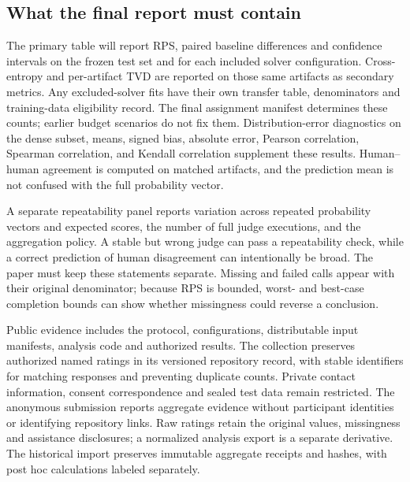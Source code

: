 \subsection{What the final report must contain}
The primary table will report RPS, paired baseline differences and confidence intervals on the frozen test set and for each included solver configuration.
Cross-entropy and per-artifact TVD are reported on those same artifacts as secondary metrics.
Any excluded-solver fits have their own transfer table, denominators and training-data eligibility record.
The final assignment manifest determines these counts; earlier budget scenarios do not fix them.
Distribution-error diagnostics on the dense subset, means, signed bias, absolute error, Pearson correlation, Spearman correlation, and Kendall correlation supplement these results.
Human--human agreement is computed on matched artifacts, and the prediction mean is not confused with the full probability vector.

A separate repeatability panel reports variation across repeated probability vectors and expected scores, the number of full judge executions, and the aggregation policy.
A stable but wrong judge can pass a repeatability check, while a correct prediction of human disagreement can intentionally be broad.
The paper must keep these statements separate.
Missing and failed calls appear with their original denominator; because RPS is bounded, worst- and best-case completion bounds can show whether missingness could reverse a conclusion.

Public evidence includes the protocol, configurations, distributable input manifests, analysis code and authorized results.
The collection preserves authorized named ratings in its versioned repository record, with stable identifiers for matching responses and preventing duplicate counts.
Private contact information, consent correspondence and sealed test data remain restricted.
The anonymous submission reports aggregate evidence without participant identities or identifying repository links.
Raw ratings retain the original values, missingness and assistance disclosures; a normalized analysis export is a separate derivative.
The historical import preserves immutable aggregate receipts and hashes, with post hoc calculations labeled separately.
